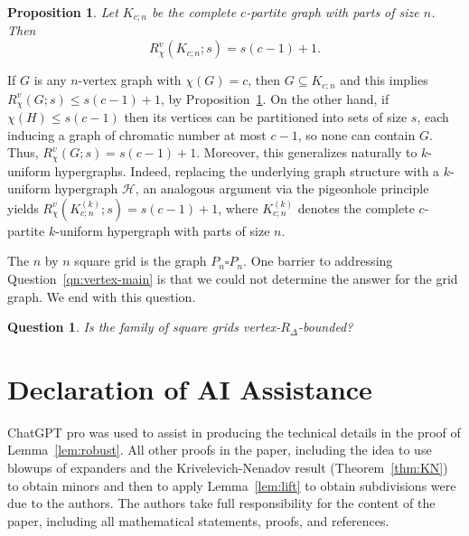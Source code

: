 \documentclass[11pt]{article}
\newtheorem{proposition}[theorem]{Proposition}
\newtheorem{question}[theorem]{Question}
\theoremstyle{definition}
\begin{document}
\begin{proposition} \label{prop:chis}
Let $K_{c;n}$ be the complete $c$-partite graph with parts of size $n$. Then
\[
R_\chi^v(K_{c;n};s) = s(c-1)+1.
\]
\end{proposition}

If $G$ is any $n$-vertex graph with $\chi(G)=c$, then $G \subseteq K_{c;n}$ and this implies $R_\chi^v(G;s) \le s(c-1)+1$, by Proposition~\ref{prop:chis}. On the other hand, if $\chi(H)\le s(c-1)$ then its vertices can be partitioned into sets of size $s$, each inducing a graph of chromatic number at most $c-1$, so none can contain $G$. Thus, $R_\chi^v(G;s) = s(c-1)+1$.
Moreover, this generalizes naturally to $k$-uniform hypergraphs. Indeed, replacing the 
underlying graph structure with a $k$-uniform hypergraph $\mathcal{H}$, an analogous argument via the pigeonhole principle 
yields $R_\chi^v(K_{c;n}^{(k)};s) = s(c-1)+1$, where $K_{c;n}^{(k)}$ denotes the complete 
$c$-partite $k$-uniform hypergraph with parts of size $n$.

 The $n$ by $n$ square grid is the graph $P_n \square P_n$. One barrier to addressing Question~\ref{qn:vertex-main} is that we could not determine the answer for the grid graph. 
We end with this question.
\begin{question}
    Is the family of square grids vertex-$R_\Delta$-bounded?
\end{question}

\section*{Declaration of AI Assistance} ChatGPT pro was used to assist in producing the technical details in the proof of Lemma~\ref{lem:robust}. All other proofs in the paper, including the idea to use blowups of expanders and the Krivelevich-Nenadov result (Theorem~\ref{thm:KN}) to obtain minors  and then to apply Lemma~\ref{lem:lift} to obtain subdivisions  were due to the authors.
The authors  take full responsibility for the content of the paper, including all mathematical statements, proofs, and references.


\end{document}
